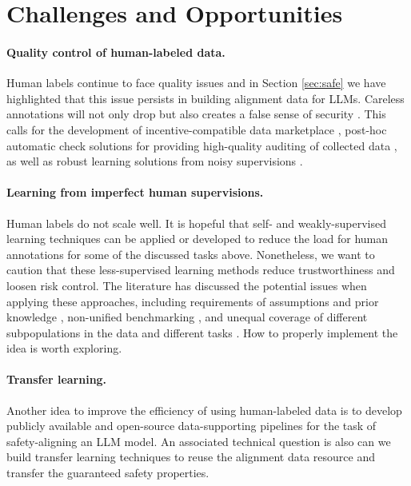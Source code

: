 \documentclass{article}
\begin{document}
\section{Challenges and Opportunities}

\paragraph{Quality control of human-labeled data.} Human labels continue to face quality issues and in Section \ref{sec:safe} we have highlighted that this issue persists in building alignment data for LLMs. Careless annotations will not only drop but also creates a false sense of security \cite{zhu2023weak}. This calls for the development of incentive-compatible data marketplace \cite{liu2023surrogate,liu2017machine,liu2020replication}, post-hoc automatic check solutions for providing high-quality auditing of collected data \cite{zhu2022detecting,zhu2021clusterability,sig15}, as well as  robust learning solutions from noisy supervisions \cite{cheng2020learning,zhu2021second}. 

\paragraph{Learning from imperfect human supervisions.} Human labels do not scale well. It is hopeful that self- and weakly-supervised learning techniques can be applied or developed to reduce the load for human annotations for  some of the discussed tasks above. Nonetheless, we want to caution that these less-supervised learning methods reduce trustworthiness and loosen risk control. The literature has discussed the potential issues when applying these approaches, including requirements of assumptions and prior knowledge \cite{natarajan2013learning,liu2020peer,wei2021when}, non-unified benchmarking \cite{wei2022learning}, and unequal coverage of different subpopulations \cite{zhu2022the,liu2021understanding} in the data and different tasks \cite{zhu2022beyond}.  How to properly implement the idea is worth exploring.

\paragraph{Transfer learning.} Another idea to improve the efficiency of using human-labeled data is to develop publicly available and open-source data-supporting pipelines for the task of safety-aligning an LLM model. An associated technical question is also can we build transfer learning techniques \cite{weiss2016survey,chen2022fairness} to reuse the alignment data resource and transfer the guaranteed safety properties.
\end{document}
